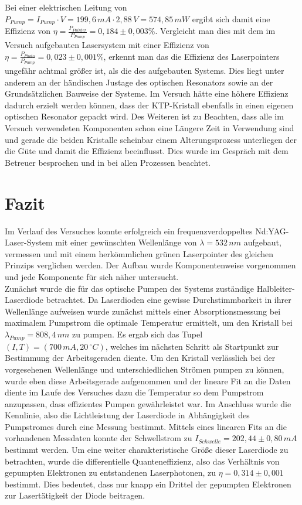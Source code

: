 \documentclass[twoside,colorback,accentcolor=tud4c,11pt]{tudreport}
\begin{document}
Bei einer elektrischen Leitung von $P_{Pump}=I_{Pump}\cdot V=199,6\,\si{mA}\cdot 2,88\,\si{V}=574,85\,\si{mW}$ ergibt sich damit eine Effizienz von $\eta=\frac{P_{Pointer}}{P_{Pump}}=0,184\pm 0,003 \%$. Vergleicht man dies mit dem im Versuch aufgebauten Lasersystem mit einer Effizienz von $\eta=\frac{P_{Photo}}{P_{Pump}}=0,023\pm0,001 \%$, erkennt man das die Effizienz des Laserpointers ungefähr achtmal größer ist, als die des aufgebauten Systems. Dies liegt unter anderem an der händischen Justage des optischen Resonators sowie an der Grundsätzlichen Bauweise der Systeme. Im Versuch hätte eine höhere Effizienz dadurch erzielt werden können, dass der KTP-Kristall ebenfalls in einen eigenen optischen Resonator gepackt wird. Des Weiteren ist zu Beachten, dass alle im Versuch verwendeten Komponenten schon eine Längere Zeit in Verwendung sind und gerade die beiden Kristalle scheinbar einem Alterungsprozess unterliegen der die Güte und damit die Effizienz beeinflusst. Dies wurde im Gespräch mit dem Betreuer besprochen und in bei allen Prozessen beachtet.

\chapter{Fazit}
Im Verlauf des Versuches konnte erfolgreich ein frequenzverdoppeltes Nd:YAG-Laser-System mit einer gewünschten Wellenlänge von $\lambda=532\,\si{nm}$ aufgebaut, vermessen und mit einem herkömmlichen grünen Laserpointer des gleichen Prinzips verglichen werden. Der Aufbau wurde Komponentenweise vorgenommen und jede Komponente für sich näher untersucht.\\
Zunächst wurde die für das optische Pumpen des Systems zuständige Halbleiter-Laserdiode betrachtet. Da Laserdioden eine gewisse Durchstimmbarkeit in ihrer Wellenlänge aufweisen wurde zunächst mittels einer Absorptionsmessung bei maximalem Pumpstrom die optimale Temperatur ermittelt, um den Kristall bei $\lambda_{Pump}=808,4\,\si{nm}$ zu pumpen. Es ergab sich das Tupel $(I,T)=(700\,\si{mA},20\,\si{^{\circ}C})$, welches im nächsten Schritt als Startpunkt zur Bestimmung der Arbeitsgeraden diente. Um den Kristall verlässlich bei der vorgesehenen Wellenlänge und unterschiedlichen Strömen pumpen zu können, wurde eben diese Arbeitsgerade aufgenommen und der lineare Fit an die Daten diente im Laufe des Versuches dazu die Temperatur so dem Pumpstrom anzupassen, dass effizientes Pumpen gewährleistet war.
Im Anschluss wurde die Kennlinie, also die Lichtleistung der Laserdiode in Abhängigkeit des Pumpstromes durch eine Messung bestimmt. Mittels eines linearen Fits an die vorhandenen Messdaten konnte der Schwellstrom zu $I_{Schwelle}=202,44\pm 0,80\,\si{mA}$ bestimmt werden. Um eine weiter charakteristische Größe dieser Laserdiode zu betrachten, wurde die differentielle Quanteneffizienz, also das Verhältnis von gepumpten Elektronen zu entstandenen Laserphotonen, zu $\eta=0,314 \pm 0,001$ bestimmt. Dies bedeutet, dass nur knapp ein Drittel der gepumpten Elektronen zur Lasertätigkeit der Diode beitragen.\\
\end{document}
